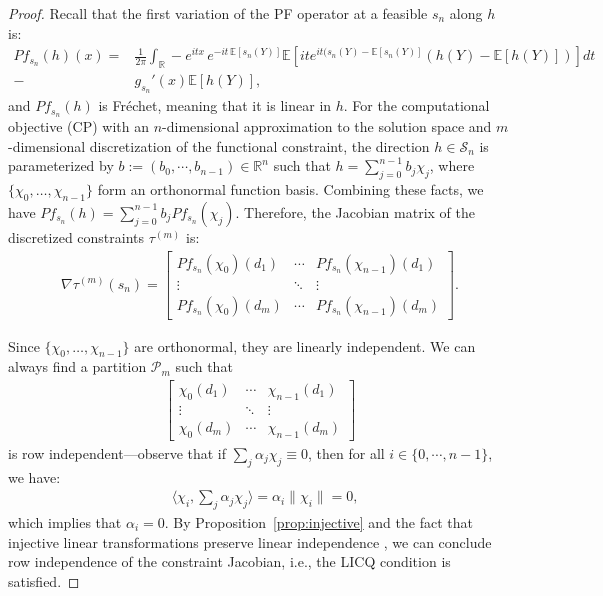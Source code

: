\documentclass[12pt,leqno]{amsart}
\begin{document}
\begin{proof}
Recall that the first variation of the PF operator at a feasible $s_n$ along $h$ is:
\begin{align*}
Pf_{s_n}(h)(x) =& \frac{1}{2\pi} \int_{\mathbb{R}} -e^{itx}\,e^{-it\,\mathbb E[s_n(Y)]}\mathbb E[ite^{it(s_n(Y)-\mathbb E[s_n(Y)]}(h(Y)-\mathbb E[h(Y)])] dt\\
    -&g_{s_n}'(x)\mathbb E [h(Y)],    
\end{align*}
and $Pf_{s_n}(h)$ is Fr\'echet, meaning that it is linear in $h$. For the computational objective \textnormal{(CP)} with an $n$-dimensional approximation to the solution space and $m$-dimensional discretization of the functional constraint, the direction $h \in \mathcal{S}_n$ is parameterized by $b:=(b_0,\cdots,b_{n-1})\in\mathbb{R}^n$ such that $h = \sum_{j=0}^{n-1} b_j \chi_j$, where $\{\chi_0, \dots, \chi_{n-1}\}$ form an orthonormal function basis. Combining these facts, we have $Pf_{s_n}(h) = \sum_{j=0}^{n-1} b_j Pf_{s_n}(\chi_j)$. Therefore, the Jacobian matrix of the discretized constraints $\tau^{(m)}$ is:
\begin{align*}
\nabla\tau^{(m)}(s_n) =
\begin{bmatrix}
Pf_{s_n}(\chi_0)(d_1) & \cdots & Pf_{s_n}(\chi_{n-1})(d_1) \\
\vdots & \ddots & \vdots \\
Pf_{s_n}(\chi_0)(d_m) & \cdots & Pf_{s_n}(\chi_{n-1})(d_m)
\end{bmatrix}.
\end{align*}


Since $\{\chi_0, \dots, \chi_{n-1}\}$ are orthonormal, they are linearly independent. We can always find a partition $\mathcal{P}_m$ such that 
\begin{align*}
\begin{bmatrix}
\chi_0(d_1) & \cdots & \chi_{n-1}(d_1) \\
\vdots & \ddots & \vdots \\
\chi_0(d_m) & \cdots & \chi_{n-1}(d_m)
\end{bmatrix}
\end{align*}
is row independent—observe that if $\sum_{j}\alpha_j \chi_j \equiv 0$, then for all $i\in\{0,\cdots,n-1\}$, we have:
\begin{align*}
    &\langle \chi_i, \sum_{j}\alpha_j \chi_j \rangle = \alpha_i \|\chi_i\|= 0,
\end{align*}
which implies that $\alpha_i = 0$. By Proposition~\ref{prop:injective} and the fact that injective linear transformations preserve linear independence \citep[Theorem 8, p.~80]{hoffmann1971linear}, we can conclude row independence of the constraint Jacobian, i.e., the LICQ condition is satisfied.
\end{proof}
\end{document}
